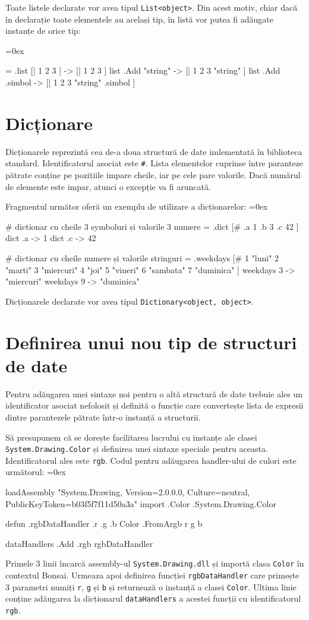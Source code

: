 \documentclass[12pt,a4paper]{memoir}
\renewcommand{\c}{\texttt}
\newenvironment{code}
{
\definecolor{shadecolor}{gray}{0.91}
\topsep=0ex
\relax
\shaded
\verbatim
}
{
\endverbatim
\endshaded
}
\begin{document}
Toate listele declarate vor avea tipul \c{List<object>}. Din acest motiv, chiar dacă în declarație toate elementele au același tip, în listă vor putea fi adăugate instanțe de orice tip:

\begin{code}
= .list [| 1 2 3 ]
  -> [| 1 2 3 ]
list .Add "string"
  -> [| 1 2 3 "string" ]
list .Add .simbol
  -> [| 1 2 3 "string" .simbol ]
\end{code}

\section{Dicționare}

Dicționarele reprezintă cea de-a doua structură de date imlementată în biblioteca standard. Identificatorul asociat este \c{\#}. Lista elementelor cuprinse între paranteze pătrate conține pe pozițiile impare cheile, iar pe cele pare valorile. Dacă numărul de elemente este impar, atunci o excepție va fi aruncată.

Fragmentul următor oferă un exemplu de utilizare a dicționarelor:
\begin{code}
# dictionar cu cheile 3 symboluri și valorile 3 numere
= .dict [# .a 1 .b 3 .c 42 ]
dict .a 
  -> 1
dict .c
  -> 42

# dictionar cu cheile numere și valorile stringuri
= .weekdays [#
  1 "luni" 
  2 "marti" 
  3 "miercuri"
  4 "joi"
  5 "vineri"
  6 "sambata"
  7 "duminica"
]
weekdays 3
  -> "miercuri"
weekdays 9
  -> "duminica"
\end{code}

Dicționarele declarate vor avea tipul \c{Dictionary<object, object>}.

\section{Definirea unui nou tip de structuri de date}

Pentru adăugarea unei sintaxe noi pentru o altă structură de date trebuie ales un identificator asociat nefolosit și definită o funcție care convertește lista de expresii dintre parantezele pătrate într-o instanță a structurii.

Să presupunem că se dorește facilitarea lucrului cu instanțe ale clasei \c{System.Drawing.Color} și definirea unei sintaxe speciale pentru aceasta. Identificatorul ales este \c{rgb}. Codul pentru adăugarea handler-ului de culori este următorul:
\newpage
\begin{code}
loadAssembly "System.Drawing, Version=2.0.0.0, Culture=neutral,
    PublicKeyToken=b03f5f7f11d50a3a"
import .Color .System.Drawing.Color

defun .rgbDataHandler .r .g .b {
	Color .FromArgb r g b
}

dataHandlers .Add .rgb rgbDataHandler
\end{code}
Primele 3 linii încarcă assembly-ul \c{System.Drawing.dll} și importă clasa \c{Color} în contextul Bonsai. Urmeaza apoi definirea funcției \c{rgbDataHandler} care primește 3 parametri numiți \c{r}, \c{g} și \c{b} și returnează o instanță a clasei \c{Color}. Ultima linie conține adăugarea la dicționarul \c{dataHandlers} a acestei funcții cu identificatorul \c{rgb}. 
\end{document}
